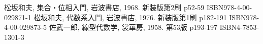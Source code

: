 \documentclass[dvipdfmx]{jsarticle}
\begin{document}
\begin{thebibliography}{50}
  松坂和夫, 集合・位相入門, 岩波書店, 1968. 新装版第2刷 p52-59 ISBN978-4-00-029871-1
  松坂和夫, 代数系入門, 岩波書店, 1976. 新装版第1刷 p182-191 ISBN978-4-00-029873-5
  佐武一郎, 線型代数学, 裳華房, 1958. 第53版 p193-197 ISBN4-7853-1301-3
\end{thebibliography}
\end{document}
